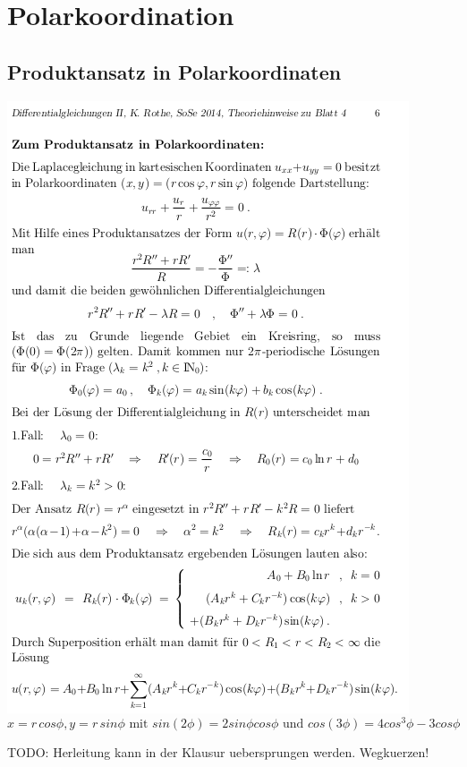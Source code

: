 \documentclass[10pt,a4paper]{article}
\begin{document}
\pagebreak
\section{Polarkoordination}
\subsection{Produktansatz in Polarkoordinaten}
\includegraphics[scale=0.6]{ununderstandable}
\[
x = r\,cos\phi, y=r\,sin\phi \mbox{ mit } sin(2\phi)=2sin\phi cos\phi \mbox{ und } cos(3\phi)=4cos^3\phi - 3cos \phi
\]

TODO: Herleitung kann in der Klausur uebersprungen werden. Wegkuerzen!
\end{document}
